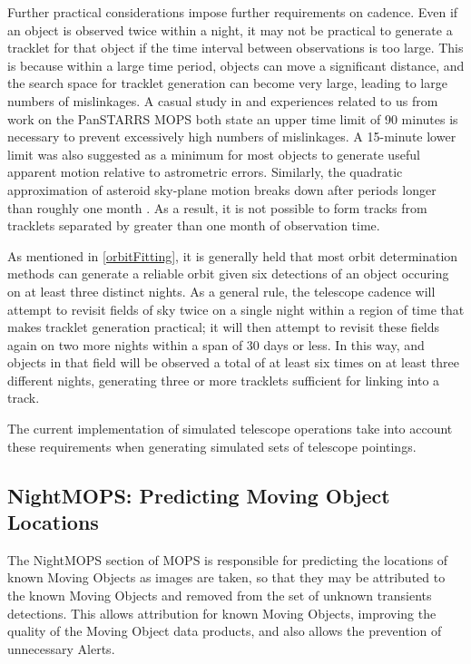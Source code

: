 \documentclass[12pt,preprint]{aastex}
\begin{document}
Further practical considerations impose further requirements on
cadence. Even if an object is observed twice within a night, it may
not be practical to generate a tracklet for that object if the time
interval between observations is too large.  This is because within a
large time period, objects can move a significant distance, and the
search space for tracklet generation can become very large, leading to
large numbers of mislinkages.  A casual study in \citet{kubica_thesis}
and experiences related to us from work on the PanSTARRS MOPS both
state an upper time limit of 90 minutes is necessary to prevent
excessively high numbers of mislinkages. A 15-minute lower limit was
also suggested as a minimum for most objects to generate useful
apparent motion relative to astrometric errors. Similarly, the
quadratic approximation of asteroid sky-plane motion breaks down after
periods longer than roughly one month \citep{kubica_thesis}.  As a
result, it is not possible to form tracks from tracklets separated by
greater than one month of observation time.

As mentioned in \ref{orbitFitting}, it is generally held that most
orbit determination methods can generate a reliable orbit given six
detections of an object occuring on at least three distinct nights.
As a general rule, the telescope cadence will attempt to revisit
fields of sky twice on a single night within a region of time that
makes tracklet generation practical; it will then attempt to revisit
these fields again on two more nights within a span of 30 days or
less.  In this way, and objects in that field will be observed a total
of at least six times on at least three different nights, generating
three or more tracklets sufficient for linking into a track.


The current implementation of simulated telescope operations
take into account these requirements when generating simulated sets of
telescope pointings. 


\subsection{NightMOPS: Predicting Moving Object Locations}

The NightMOPS section of MOPS is responsible for predicting the
locations of known Moving Objects as images are taken, so that they
may be attributed to the known Moving Objects and removed from the set
of unknown transients detections.  This allows attribution for known
Moving Objects, improving the quality of the Moving Object data
products, and also allows the prevention of unnecessary Alerts.
\end{document}
